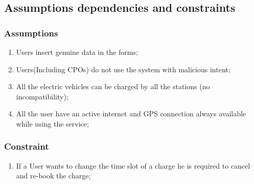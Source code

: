 \subsection{Assumptions dependencies and constraints}
\subsubsection{Assumptions}
\begin{enumerate}[label=\textbf{DA\arabic*}]
      \item Users insert genuine data in the forms;
      \item Users(Including CPOs) do not use the system with malicious intent;
      \item All the electric vehicles can be charged by all the stations (no incompatibility);
      \item All the user have an active internet and GPS connection always available while using the service;
\end{enumerate}
\subsubsection{Constraint}
\begin{enumerate}[label=\textbf{C\arabic*}]
      \item If a User wants to change the time slot of a charge he is required to cancel and re-book the charge;
\end{enumerate}

\clearpage
